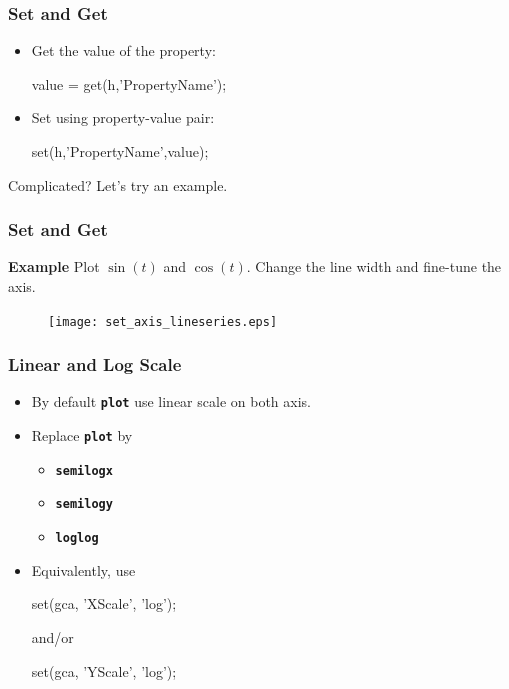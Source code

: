\documentclass[compress]{beamer}  %
\newcommand{\tttbf}[1]{\texttt{\textbf{#1}}} %
\begin{document}
\begin{frame}[fragile]
\frametitle{Set and Get}
\begin{itemize}
    \item Get the value of the property:
          \begin{matlabcode}[frame=none]
          value = get(h,'PropertyName');
          \end{matlabcode}
          
    \item Set using property-value pair:
          \begin{matlabcode}[frame=none]
          set(h,'PropertyName',value);
          \end{matlabcode}
\end{itemize}
Complicated? Let's try an example.
\end{frame}
\begin{frame}[fragile]
\frametitle{Set and Get}
\textbf{Example} 
Plot $\sin(t)$ and $\cos(t)$. Change the line width and fine-tune the axis.
\setcounter{subfigure}{0}
\begin{figure}
    \centering
    \texttt{[image: set\_axis\_lineseries.eps]}
\end{figure}

\end{frame}
\begin{frame}[fragile]
\frametitle{Linear and Log Scale}
\begin{itemize}[<+->]
    \item By default \tttbf{plot} use linear scale on both axis.
    
    \item Replace \tttbf{plot} by
    \begin{itemize}
        \item \tttbf{semilogx}
        \item \tttbf{semilogy}
        \item \tttbf{loglog}
    \end{itemize}        
    
    \item Equivalently, use 
          \begin{matlabcode}[numbers=none,frame=none]
          set(gca, 'XScale', 'log');
          \end{matlabcode}
          and/or
          \begin{matlabcode}[numbers=none,frame=none]
          set(gca, 'YScale', 'log');
          \end{matlabcode}
\end{itemize}

\end{frame}
\end{document}
